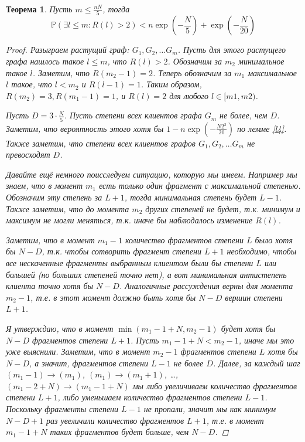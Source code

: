 \documentclass[10pt]{article}
\newcommand{\PRob}{\mathbb P}
\newcommand{\leqs}{\leqslant}
\newtheorem{theorem}{Теорема}
\theoremstyle{named}
\begin{document}
\begin{theorem}
Пусть $m \leqs \frac{nN}{5}$, тогда
\begin{equation}
\PRob\left(\exists l \leqs m : R(l) > 2 \right) < n\exp\left(-\frac{N}{5}\right) +  \exp\left(- \frac{N}{20}\right)
\end{equation}

\begin{proof}
Разыграем растущий граф: $G_1, G_2, \dots G_m$. Пусть для этого растущего графа нашлось такое $l \leqs m$, что $ R(l) > 2$.
Обозначим за $m_2$ минимальное такое $l$. Заметим, что $R(m_2 - 1) = 2$. 
Теперь обозначим за $m_1$ максимальное $l$ такое, что $l < m_2$ и $R(l-1) = 1$.
Таким образом, $R(m_2) = 3, R(m_1 - 1) = 1$, и $R(l) = 2$ для любого $l \in [m1, m2)$.

Пусть $D = 3 \cdot \frac{N}{5}$. Пусть степени всех клиентов графа $G_m$ не более, чем $D$. 
Заметим, что вероятность этого хотя бы $1 -  n\exp\left(-\frac{N 2^2}{20}\right)$ по лемме \ref{l4}.
Также заметим, что степени всех клиентов графов $G_1, G_2, \dots G_m$ не превосходят $D$.

Давайте ещё немного поисследуем ситуацию, которую мы имеем. Например мы знаем, что в момент $m_1$ есть 
только один фрагмент с максимальной степенью. Обозначим эту степень за $L + 1$, тогда минимальная степень будет $L - 1$.
Также заметим, что до момента $m_2$ других степеней не будет, т.к. минимум и максимум не могли меняться, т.к. иначе бы 
наблюдалось изменение $R(l)$. 

Заметим, что в момент $m_1 - 1$ 
количество фрагментов степени $L$ было хотя бы $N-D$, т.к. чтобы сотворить фрагмент степени $L+1$ необходимо, 
чтобы все нескаченные фрагменты выбранным клиентом были бы степени $L$ или большей (но больших степеней точно нет), а вот минимальная антистепень 
клиента точно хотя бы $N - D$. Аналогичные рассуждения верны для момента $m_2 - 1$, т.е. в этот момент должно быть хотя бы $N - D$
вершин степени $L+1$. 

Я утверждаю, что в момент $\min(m_1 - 1 + N, m_2 - 1)$ будет хотя бы $N-D$ фрагментов степени $L+1$.
Пусть $m_1 - 1 + N < m_2 - 1$, иначе мы это уже выяснили.
Заметим, что в момент $m_2 - 1$ фрагментов степени $L$ хотя бы $N-D$, а значит,
фрагментов степени $L - 1$ не более $D$. Далее, за каждый шаг $(m_1 - 1) \to (m_1)$, $(m_1) \to (m_1 + 1)$, \dots, 
$(m_1 - 2 + N) \to (m_1 - 1 + N)$
 мы либо увеличиваем количество фрагментов степени $L+1$, либо уменьшаем количество фрагментов степени $L-1$.
Поскольку фрагменты степени $L-1$ не пропали, значит мы как минимум $N-D + 1$ раз увеличили количество фрагментов $L+1$, 
т.е. в момент $m_1 - 1 + N$ таких фрагментов будет больше, чем $N - D$.


\end{proof}
\end{theorem}
\end{document}
